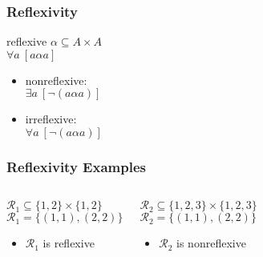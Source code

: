 \documentclass[dvipsnames]{beamer}
\begin{document}
\begin{frame}
  \frametitle{Reflexivity}

  \begin{block}{reflexive}
    $\alpha \subseteq A \times A$\\
    $\forall a~[a \alpha a]$
  \end{block}

  \pause
  \begin{itemize}
    \item nonreflexive:\\
      $\exists a~[\neg (a \alpha a)]$

    \pause
    \item irreflexive:\\
      $\forall a~[\neg (a \alpha a)]$
  \end{itemize}
\end{frame}

\begin{frame}
  \frametitle{Reflexivity Examples}

  \begin{columns}[t]
    \begin{example}
      $\mathcal{R}_1 \subseteq \{1,2\} \times \{1,2\}$\\
      $\mathcal{R}_1 = \{(1,1), (2,2)\}$

      \medskip
      \begin{itemize}
        \item $\mathcal{R}_1$ is reflexive
      \end{itemize}
    \end{example}

    \pause
    \begin{example}
      $\mathcal{R}_2 \subseteq \{1,2,3\} \times \{1,2,3\}$\\
      $\mathcal{R}_2 = \{(1,1), (2,2)\}$

      \medskip
      \begin{itemize}
        \item $\mathcal{R}_2$ is nonreflexive
      \end{itemize}
    \end{example}
  \end{columns}
\end{frame}
\end{document}
